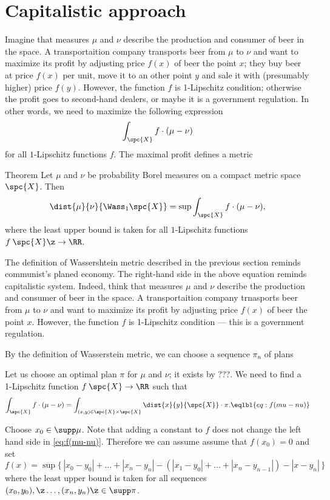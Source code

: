 \section{Capitalistic approach}

Imagine that measures $\mu$ and $\nu$ describe the production and consumer of beer in the space.
A transportaition company transports beer from $\mu$ to $\nu$ and want to maximize its profit by adjusting price $f(x)$ of beer the point $x$; they buy beer at price $f(x)$ per unit, move it to an other point $y$ and sale it with (presumably higher) price $f(y)$.
However, the function $f$ is 1-Lipschitz condition;
otherwise the profit goes to second-hand dealers, or maybe it is a government regulation.
In other words, we need to maximize the following expression
\[\int_{\spc{X}} f\cdot(\mu-\nu)\]
for all $1$-Lipschitz functions $f$.
The maximal profit defines a metric

\begin{thm}{Theorem}
Let $\mu$ and $\nu$ be probability Borel measures on a compact metric space $\spc{X}$.
Then
\[\dist{\mu}{\nu}{\Wass_1\spc{X}}=\sup\int_{\spc{X}} f\cdot(\mu-\nu),\]
where the least upper bound is taken for all $1$-Lipschitz functions $f\:\spc{X}\z\to\RR$.
\end{thm}

The definition of Wassershtein metric described in the previous section reminds communist's planed economy.
The right-hand side in the above equation reminds capitalistic system.
Indeed, think that measures $\mu$ and $\nu$ describe the production and consumer of beer in the space.
A transportaition company trnasports beer from $\mu$ to $\nu$ and want to maximize its profit by adjusting price $f(x)$ of beer the point $x$.
However, the function $f$ is 1-Lipschitz condition --- this is a government regulation.




By the definition of Wasserstein metric, we can choose a sequence $\pi_n$ of plans  

Let us choose an optimal plan $\pi$ for $\mu$ and $\nu$; it exists by ???.
We need to find a 1-Lipschitz function $f\:\spc{X}\to\RR$ such that 
\[
\int_{\spc{X}} f\cdot(\mu-\nu)=\int_{(x,y)\in\spc{X}\times\spc{X}}\dist{x}{y}{\spc{X}}\cdot \pi.
\eqlbl{eq:f(mu-nu)}
\]

Choose $x_0\in \supp\mu$.
Note that adding a constant to $f$ does not change the left hand side in \ref{eq:f(mu-nu)}.
Therefore we can assume assume that $f(x_0)=0$ and set
\[f(x)=\sup\{\,|x_0-y_0|+\dots+|x_n-y_n|-(|x_1-y_0|+\dots+|x_n-y_{n-1}|)-|x-y_n|\,\}\]
where the least upper bound is taken for all sequences $(x_0,y_0),\z\dots,(x_n,y_n)\z\in\supp\pi$.

